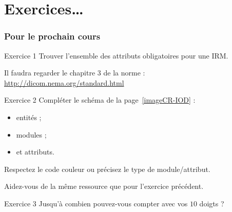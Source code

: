 \section{Exercices\ldots}

	\frame
	{
		\frametitle{Pour le prochain cours}
		
			\begin{block}{Exercice 1}
				Trouver l'ensemble des attributs obligatoires pour une IRM.

				Il faudra regarder le chapitre 3 de la norme : \url{http://dicom.nema.org/standard.html}
			\end{block}

			\begin{block}{Exercice 2}
				Compl\'eter le sch\'ema de la page~\ref{imageCR-IOD} :
				\begin{itemize}
					\item entit\'es ;
					\item modules ;
					\item et attributs.
				\end{itemize}
				Respectez le code couleur ou pr\'ecisez le type de module/attribut.

				Aidez-vous de la m\^eme ressource que pour l'exercice pr\'ec\'edent.
			\end{block}

			\begin{block}{Exercice 3}
				Jusqu'\`a combien pouvez-vous compter avec vos $10$ doigts ?
			\end{block}
	}
